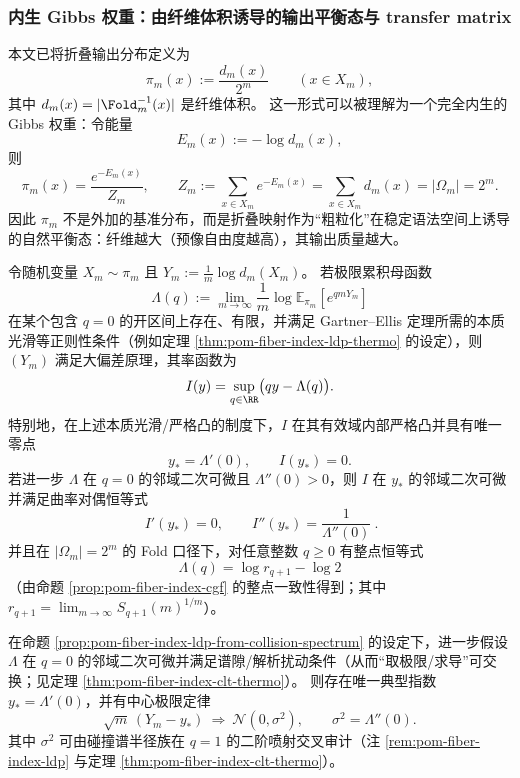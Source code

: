 \subsubsection{内生 Gibbs 权重：由纤维体积诱导的输出平衡态与 transfer matrix}\label{subsubsec:pom-gibbs-pi}
本文已将折叠输出分布定义为
\[
\pi_m(x):=\frac{d_m(x)}{2^m}\qquad(x\in X_m),
\]
其中 \(d_m(x)=|\Fold_m^{-1}(x)|\) 是纤维体积。
这一形式可以被理解为一个完全内生的 Gibbs 权重：令能量
\[
E_m(x):=-\log d_m(x),
\]
则
\[
\pi_m(x)=\frac{e^{-E_m(x)}}{Z_m},
\qquad
Z_m:=\sum_{x\in X_m}e^{-E_m(x)}=\sum_{x\in X_m}d_m(x)=|\Omega_m|=2^m.
\]
因此 \(\pi_m\) 不是外加的基准分布，而是折叠映射作为“粗粒化”在稳定语法空间上诱导的自然平衡态：纤维越大（预像自由度越高），其输出质量越大。
\par

\begin{proposition}\label{prop:pom-fiber-index-ldp-from-collision-spectrum}
令随机变量 \(X_m\sim\pi_m\) 且 \(Y_m:=\frac{1}{m}\log d_m(X_m)\)。
若极限累积母函数
\[
\Lambda(q):=\lim_{m\to\infty}\frac{1}{m}\log\mathbb{E}_{\pi_m}\!\left[e^{qmY_m}\right]
\]
在某个包含 \(q=0\) 的开区间上存在、有限，并满足 Gartner--Ellis 定理所需的本质光滑等正则性条件（例如定理 \ref{thm:pom-fiber-index-ldp-thermo} 的设定），则 \((Y_m)\) 满足大偏差原理，其率函数为
\[
I(y)=\sup_{q\in\RR}\bigl(qy-\Lambda(q)\bigr).
\]
特别地，在上述本质光滑/严格凸的制度下，\(I\) 在其有效域内部严格凸并具有唯一零点
\[
y_\ast=\Lambda'(0),\qquad I(y_\ast)=0.
\]
若进一步 \(\Lambda\) 在 \(q=0\) 的邻域二次可微且 \(\Lambda''(0)>0\)，则 \(I\) 在 \(y_\ast\) 的邻域二次可微并满足曲率对偶恒等式
\[
\boxed{\ I'(y_\ast)=0,\qquad I''(y_\ast)=\frac{1}{\Lambda''(0)}\ }.
\]
并且在 \(|\Omega_m|=2^m\) 的 Fold 口径下，对任意整数 \(q\ge 0\) 有整点恒等式
\[
\boxed{\ \Lambda(q)=\log r_{q+1}-\log 2\ }
\]
（由命题 \ref{prop:pom-fiber-index-cgf} 的整点一致性得到；其中 \(r_{q+1}=\lim_{m\to\infty}S_{q+1}(m)^{1/m}\)）。
\end{proposition}

\begin{corollary}\label{cor:pom-fiber-index-clt-variance-certificate}
在命题 \ref{prop:pom-fiber-index-ldp-from-collision-spectrum} 的设定下，进一步假设 \(\Lambda\) 在 \(q=0\) 的邻域二次可微并满足谱隙/解析扰动条件（从而“取极限/求导”可交换；见定理 \ref{thm:pom-fiber-index-clt-thermo}）。
则存在唯一典型指数 \(y_\ast=\Lambda'(0)\)，并有中心极限定律
\[
\sqrt{m}\,(Y_m-y_\ast)\ \Longrightarrow\ \mathcal N(0,\sigma^2),
\qquad
\sigma^2=\Lambda''(0).
\]
其中 \(\sigma^2\) 可由碰撞谱半径族在 \(q=1\) 的二阶喷射交叉审计（注 \ref{rem:pom-fiber-index-ldp} 与定理 \ref{thm:pom-fiber-index-clt-thermo}）。
\end{corollary}

